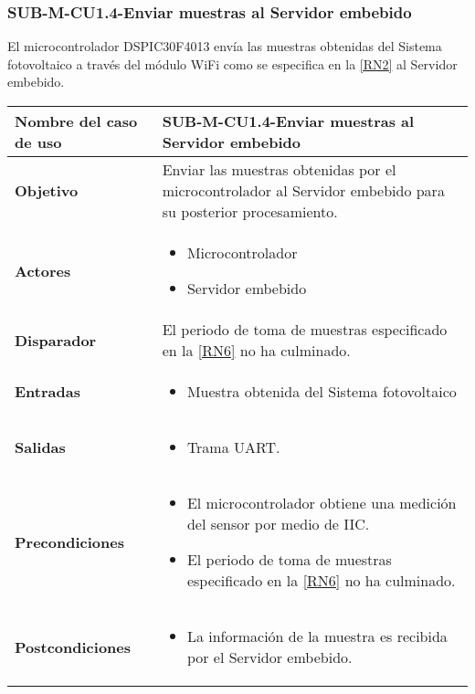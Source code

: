 \subsubsection{SUB-M-CU1.4-Enviar muestras al Servidor embebido}\label{SUB-M-CU1.4}
El microcontrolador DSPIC30F4013 envía las muestras obtenidas del Sistema fotovoltaico a través del módulo WiFi como se especifica en la \ref{RN2} al Servidor embebido.
\begin{longtable}{|J{5cm}|J{10.3cm}|}
	\hline
	\textbf{Nombre del caso de uso} &
		SUB-M-CU1.4-Enviar muestras al Servidor embebido \\ \hline
	\textbf{Objetivo} &
		Enviar las muestras obtenidas por el microcontrolador al Servidor embebido para su posterior procesamiento. \\ \hline
	\textbf{Actores} &
	    \begin{itemize}
		    \item Microcontrolador
		    \item Servidor embebido
		\end{itemize}\\ \hline 
	\textbf{Disparador} & 
		El periodo de toma de muestras especificado en la \ref{RN6} no ha culminado.\\ \hline 
	\textbf{Entradas} & %
		\begin{itemize}
				\item Muestra obtenida del Sistema fotovoltaico
		\end{itemize}
		\\ \hline 
	\textbf{Salidas} & 
	    \begin{itemize}
	        \item Trama UART.
	    \end{itemize}\\ \hline
	\textbf{Precondiciones} & 
		\begin{itemize}
		    \item El microcontrolador obtiene una medición del sensor por medio de IIC.
		    \item El periodo de toma de muestras especificado en la \ref{RN6} no ha culminado.
		\end{itemize}\\ \hline
	\textbf{Postcondiciones} &
		\begin{itemize}
			\item La información de la muestra es recibida por el Servidor embebido.
		\end{itemize} \\ \hline

\end{longtable}
